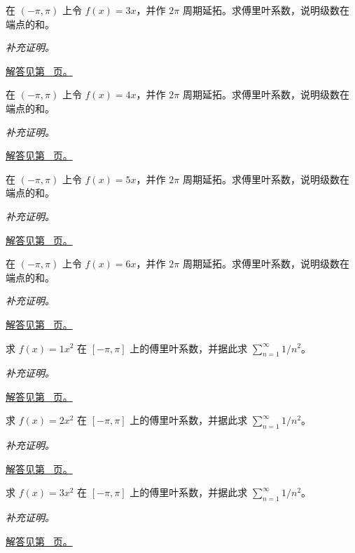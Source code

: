 \documentclass[12pt,fontset=fandol]{ctexart}
\begin{document}
\begin{example}[锯齿函数的傅里叶系数]\label{ex:c28q15}
在 $(-\pi,\pi)$ 上令 $f(x)=3x$，并作 $2\pi$ 周期延拓。求傅里叶系数，说明级数在端点的和。
\par\textit{补充证明。}\par\hyperref[ans:c28q15]{解答见第~\pageref{ans:c28q15} 页。}
\end{example}
\begin{example}[锯齿函数的傅里叶系数]\label{ex:c28q16}
在 $(-\pi,\pi)$ 上令 $f(x)=4x$，并作 $2\pi$ 周期延拓。求傅里叶系数，说明级数在端点的和。
\par\textit{补充证明。}\par\hyperref[ans:c28q16]{解答见第~\pageref{ans:c28q16} 页。}
\end{example}
\begin{example}[锯齿函数的傅里叶系数]\label{ex:c28q17}
在 $(-\pi,\pi)$ 上令 $f(x)=5x$，并作 $2\pi$ 周期延拓。求傅里叶系数，说明级数在端点的和。
\par\textit{补充证明。}\par\hyperref[ans:c28q17]{解答见第~\pageref{ans:c28q17} 页。}
\end{example}
\begin{example}[锯齿函数的傅里叶系数]\label{ex:c28q18}
在 $(-\pi,\pi)$ 上令 $f(x)=6x$，并作 $2\pi$ 周期延拓。求傅里叶系数，说明级数在端点的和。
\par\textit{补充证明。}\par\hyperref[ans:c28q18]{解答见第~\pageref{ans:c28q18} 页。}
\end{example}
\begin{example}[平方函数的余弦展开]\label{ex:c28q19}
求 $f(x)=1x^2$ 在 $[-\pi,\pi]$ 上的傅里叶系数，并据此求 $\sum_{n=1}^\infty1/n^2$。
\par\textit{补充证明。}\par\hyperref[ans:c28q19]{解答见第~\pageref{ans:c28q19} 页。}
\end{example}
\begin{example}[平方函数的余弦展开]\label{ex:c28q20}
求 $f(x)=2x^2$ 在 $[-\pi,\pi]$ 上的傅里叶系数，并据此求 $\sum_{n=1}^\infty1/n^2$。
\par\textit{补充证明。}\par\hyperref[ans:c28q20]{解答见第~\pageref{ans:c28q20} 页。}
\end{example}
\begin{example}[平方函数的余弦展开]\label{ex:c28q21}
求 $f(x)=3x^2$ 在 $[-\pi,\pi]$ 上的傅里叶系数，并据此求 $\sum_{n=1}^\infty1/n^2$。
\par\textit{补充证明。}\par\hyperref[ans:c28q21]{解答见第~\pageref{ans:c28q21} 页。}
\end{example}
\end{document}
